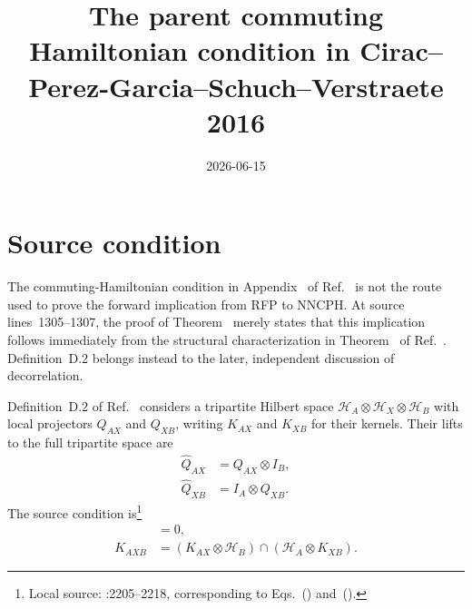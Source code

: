\documentclass{article}
\title{The parent commuting Hamiltonian condition in Cirac--Perez-Garcia--Schuch--Verstraete 2016}
\author{}
\date{2026-06-15}
\begin{document}
\maketitle
{}

\section{Source condition}

The commuting-Hamiltonian condition in Appendix~ of
Ref.~\cite{Cirac2016MPDO_arXiv} is not the route used to prove the forward
implication from RFP to NNCPH. At source lines~1305--1307, the proof of
Theorem~ merely states that this implication follows
immediately from the structural characterization in
Theorem~ of Ref.~\cite{Cirac2016MPDO_arXiv}.
Definition~D.2 belongs instead to the later, independent discussion of
decorrelation.

Definition~D.2 of Ref.~\cite{Cirac2016MPDO_arXiv} considers a tripartite
Hilbert space $\mathcal H_A\otimes\mathcal H_X\otimes\mathcal H_B$ with local
projectors $Q_{AX}$ and $Q_{XB}$, writing $K_{AX}$ and $K_{XB}$ for their
kernels. Their lifts to the full tripartite space are
\begin{align}
    \widehat Q_{AX}
        &=Q_{AX}\otimes I_B,
    \label{eq:cpsv16_parent_commuting_hamiltonian_scope_qax_lift}\\
    \widehat Q_{XB}
        &=I_A\otimes Q_{XB}.
    \label{eq:cpsv16_parent_commuting_hamiltonian_scope_qxb_lift}
\end{align}
The source condition is\footnote{Local source:
:2205--2218, corresponding to
Eqs.~() and~().}
\begin{align}
    [\widehat Q_{AX},\widehat Q_{XB}]
        &=0,
    \label{eq:cpsv16_parent_commuting_hamiltonian_scope_source_commutation}\\
    K_{AXB}
        &=(K_{AX}\otimes\mathcal H_B)
          \cap(\mathcal H_A\otimes K_{XB}).
    \label{eq:cpsv16_parent_commuting_hamiltonian_scope_source_kernel_intersection}
\end{align}
\end{document}
